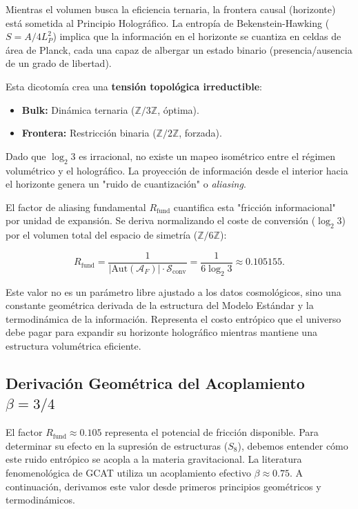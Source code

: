 \documentclass[12pt, a4paper]{article}
\theoremstyle{plain}
\theoremstyle{definition}
\begin{document}
Mientras el volumen busca la eficiencia ternaria, la frontera causal (horizonte) está sometida al Principio Holográfico. La entropía de Bekenstein-Hawking ($S = A/4L_P^2$) implica que la información en el horizonte se cuantiza en celdas de área de Planck, cada una capaz de albergar un estado binario (presencia/ausencia de un grado de libertad).

Esta dicotomía crea una \textbf{tensión topológica irreductible}:
\begin{itemize}
    \item \textbf{Bulk:} Dinámica ternaria ($\mathbb{Z}/3\mathbb{Z}$, óptima).
    \item \textbf{Frontera:} Restricción binaria ($\mathbb{Z}/2\mathbb{Z}$, forzada).
\end{itemize}

Dado que $\log_2 3$ es irracional, no existe un mapeo isométrico entre el régimen volumétrico y el holográfico. La proyección de información desde el interior hacia el horizonte genera un "ruido de cuantización" o \textit{aliasing}. 

El factor de aliasing fundamental $R_{\text{fund}}$ cuantifica esta "fricción informacional" por unidad de expansión. Se deriva normalizando el coste de conversión ($\log_2 3$) por el volumen total del espacio de simetría ($\mathbb{Z}/6\mathbb{Z}$):

\begin{equation}
R_{\text{fund}} = \frac{1}{|\text{Aut}(\mathcal{A}_F)| \cdot \mathcal{S}_{\text{conv}}} = \frac{1}{6 \log_2 3} \approx 0.105155.
\label{eq:rfund_derivation}
\end{equation}

Este valor no es un parámetro libre ajustado a los datos cosmológicos, sino una constante geométrica derivada de la estructura del Modelo Estándar y la termodinámica de la información. Representa el costo entrópico que el universo debe pagar para expandir su horizonte holográfico mientras mantiene una estructura volumétrica eficiente.

\subsection{Derivación Geométrica del Acoplamiento \texorpdfstring{$\beta = 3/4$}{beta=3/4}}
\label{subsec:beta_derivation}

El factor $R_{\text{fund}} \approx 0.105$ representa el potencial de fricción disponible. Para determinar su efecto en la supresión de estructuras ($S_8$), debemos entender cómo este ruido entrópico se acopla a la materia gravitacional. La literatura fenomenológica de GCAT utiliza un acoplamiento efectivo $\beta \approx 0.75$. A continuación, derivamos este valor desde primeros principios geométricos y termodinámicos.
\end{document}
